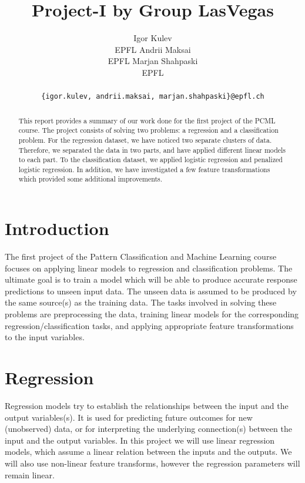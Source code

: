 \documentclass{article} %
\title{Project-I by Group LasVegas}
\author{
Igor Kulev \\
EPFL \And
Andrii Maksai \\
EPFL \And
Marjan Shahpaski \\
EPFL \\\\
\texttt{\{igor.kulev, andrii.maksai, marjan.shahpaski\}@epfl.ch}\\
}
\begin{document}
\maketitle

\begin{abstract}
This report provides a summary of our work done for the first project of the PCML course. 
The project consists of solving two problems: a regression and a classification problem. 
For the regression dataset, we have noticed two separate clusters of data. 
Therefore, we separated the data in two parts, and have applied different linear models to each part. 
To the classification dataset, we applied logistic regression and penalized
logistic regression.
In addition, we have investigated a few feature transformations which provided some additional improvements.
\end{abstract}

\section{Introduction}

The first project of the Pattern Classification and Machine Learning course focuses on 
applying linear models to regression and classification problems. 
The ultimate goal is to train a model which will be able to produce accurate response predictions 
to unseen input data. The unseen data is assumed to be produced by the same source(s) as the training data. 
The tasks involved in solving these problems are preprocessing the data, 
training linear models for the corresponding regression/classification tasks, 
and applying appropriate feature transformations to the input variables.


\section{Regression}

Regression models try to establish the relationships between the input and the output variables(s). 
It is used for predicting future outcomes for new (unobserved) data, or for interpreting 
the underlying connection(s) between the input and the output variables. 
In this project we will use linear regression models, which assume a linear relation between the 
inputs and the outputs. 
We will also use non-linear feature transforms, however the regression parameters will remain linear.
\end{document}
